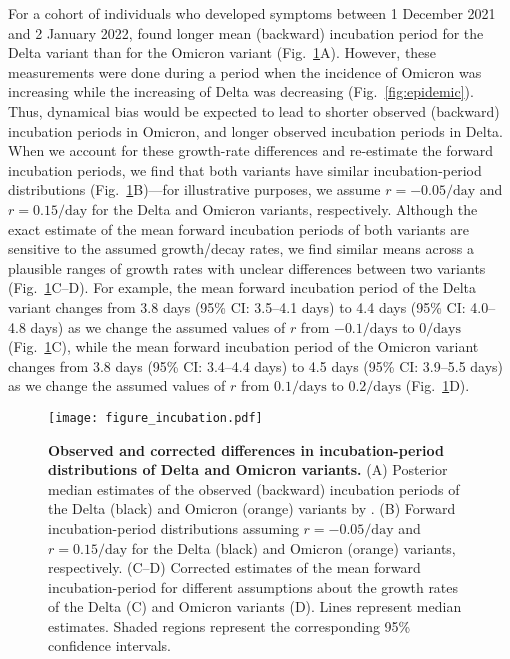 \documentclass[12pt]{article}
\newcommand{\comment}{\showcomment}
\newcommand{\showcomment}[3]{\textcolor{#1}{\textbf{[#2: }\textsl{#3}\textbf{]}}}
\newcommand{\jd}[1]{\comment{cyan}{JD}{#1}}
\newcommand{\swp}[1]{\comment{magenta}{SWP}{#1}}
\newcommand{\fref}[1]{Fig.~\ref{fig:#1}}
\begin{document}
For a cohort of individuals who developed symptoms between 1 December 2021 and 2 January 2022, \citep{backer2021omicron} found longer mean (backward) incubation period for the Delta variant than for the Omicron variant (\fref{incubation}A).
However, these measurements were done during a period when the incidence of Omicron was increasing while the increasing of Delta was decreasing (\fref{epidemic}).
Thus, dynamical bias would be expected to lead to shorter observed (backward) incubation periods in Omicron, and longer observed incubation periods in Delta. 
When we account for these growth-rate differences and re-estimate the forward incubation periods, we find that both variants have similar incubation-period distributions (\fref{incubation}B)---for illustrative purposes, we assume $r=-0.05/\mathrm{day}$ and $r=0.15/\mathrm{day}$ for the Delta and Omicron variants, respectively.
Although the exact estimate of the mean forward incubation periods of both variants are sensitive to the assumed growth/decay rates, we find similar means across a plausible ranges of growth rates with unclear differences between two variants (\fref{incubation}C--D).
For example, the mean forward incubation period of the Delta variant changes from 3.8 days (95\% CI: 3.5--4.1 days) to 4.4 days (95\% CI: 4.0--4.8 days) as we change the assumed values of $r$ from $-0.1/\mathrm{days}$ to $0/\mathrm{days}$ (\fref{incubation}C), while
the mean forward incubation period of the Omicron variant changes from 3.8 days (95\% CI: 3.4--4.4 days) to 4.5 days (95\% CI: 3.9--5.5 days) as we change the assumed values of $r$ from $0.1/\mathrm{days}$ to $0.2/\mathrm{days}$ (\fref{incubation}D).

\begin{figure}[!th]
\texttt{[image: figure\_incubation.pdf]}
\caption{
\textbf{Observed and corrected differences in incubation-period distributions of Delta and Omicron variants.}
(A) Posterior median estimates of the observed (backward) incubation periods of the Delta (black) and Omicron (orange) variants by \cite{backer2021omicron}.
(B) Forward incubation-period distributions assuming $r=-0.05/\mathrm{day}$ and $r=0.15/\mathrm{day}$ for the Delta (black) and Omicron (orange) variants, respectively.
(C--D) Corrected estimates of the mean forward incubation-period for different assumptions about the growth rates of the Delta (C) and Omicron variants (D).
Lines represent median estimates.
Shaded regions represent the corresponding 95\% confidence intervals.
\label{fig:incubation}
}
\end{figure}
\end{document}
